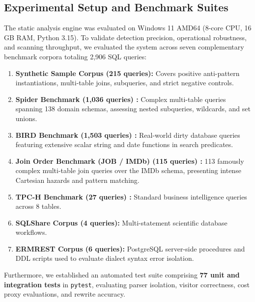 \documentclass[conference]{IEEEtran}
\begin{document}
\subsection{Experimental Setup and Benchmark Suites}
The static analysis engine was evaluated on Windows 11 AMD64 (8-core CPU, 16 GB RAM, Python 3.15). To validate detection precision, operational robustness, and scanning throughput, we evaluated the system across seven complementary benchmark corpora totaling 2,906 SQL queries:
\begin{enumerate}
    \item \textbf{Synthetic Sample Corpus (215 queries):} Covers positive anti-pattern instantiations, multi-table joins, subqueries, and strict negative controls.
    \item \textbf{Spider Benchmark (1,036 queries) \cite{yu2018spider}:} Complex multi-table queries spanning 138 domain schemas, assessing nested subqueries, wildcards, and set unions.
    \item \textbf{BIRD Benchmark (1,503 queries) \cite{li2024bird}:} Real-world dirty database queries featuring extensive scalar string and date functions in search predicates.
    \item \textbf{Join Order Benchmark (JOB / IMDb) (115 queries) \cite{leis2015good}:} 113 famously complex multi-table join queries over the IMDb schema, presenting intense Cartesian hazards and pattern matching.
    \item \textbf{TPC-H Benchmark (27 queries) \cite{tpch}:} Standard business intelligence queries across 8 tables.
    \item \textbf{SQLShare Corpus (4 queries):} Multi-statement scientific database workflows.
    \item \textbf{ERMREST Corpus (6 queries):} PostgreSQL server-side procedures and DDL scripts used to evaluate dialect syntax error isolation.
\end{enumerate}

Furthermore, we established an automated test suite comprising \textbf{77 unit and integration tests} in \texttt{pytest}, evaluating parser isolation, visitor correctness, cost proxy evaluations, and rewrite accuracy.
\end{document}
